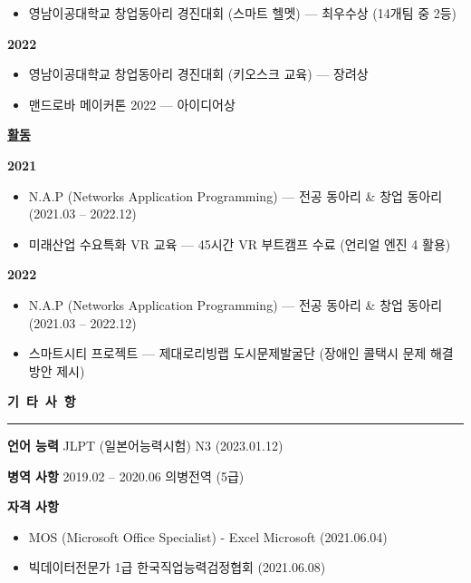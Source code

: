 \documentclass[a4paper, 10pt]{article}
\newcommand{\resumesection}[1]{%
  \vspace{8pt}
  \noindent
  {\large\bfseries #1}
  \vspace{2pt}
  \noindent\hrule
  \vspace{4pt}
}
\begin{document}
\begin{itemize}
  \setlength{\itemsep}{1pt}
  \setlength{\parskip}{0pt}
  \item 영남이공대학교 창업동아리 경진대회 (스마트 헬멧) — 최우수상 (14개팀 중 2등)
\end{itemize}

\vspace{2pt}
\noindent
\textbf{2022}

\begin{itemize}
  \setlength{\itemsep}{1pt}
  \setlength{\parskip}{0pt}
  \item 영남이공대학교 창업동아리 경진대회 (키오스크 교육) — 장려상
  \item 맨드로바 메이커톤 2022 — 아이디어상
\end{itemize}

\vspace{4pt}
\noindent
\textbf{\underline{활동}}

\vspace{2pt}
\noindent
\textbf{2021}

\begin{itemize}
  \setlength{\itemsep}{1pt}
  \setlength{\parskip}{0pt}
  \item N.A.P (Networks Application Programming) — 전공 동아리 & 창업 동아리 (2021.03 -- 2022.12)
  \item 미래산업 수요특화 VR 교육 — 45시간 VR 부트캠프 수료 (언리얼 엔진 4 활용)
\end{itemize}

\vspace{2pt}
\noindent
\textbf{2022}

\begin{itemize}
  \setlength{\itemsep}{1pt}
  \setlength{\parskip}{0pt}
  \item N.A.P (Networks Application Programming) — 전공 동아리 & 창업 동아리 (2021.03 -- 2022.12)
  \item 스마트시티 프로젝트 — 제대로리빙랩 도시문제발굴단 (장애인 콜택시 문제 해결방안 제시)
\end{itemize}


\newpage

\resumesection{기\ 타\ 사\ 항}

\vspace{3pt}
\noindent
\textbf{언어 능력} \hfill JLPT (일본어능력시험) N3 (2023.01.12)

\vspace{2pt}
\noindent
\textbf{병역 사항} \hfill 2019.02 -- 2020.06 의병전역 (5급)

\vspace{2pt}
\noindent
\textbf{자격 사항}

\begin{itemize}
  \setlength{\itemsep}{1pt}
  \setlength{\parskip}{0pt}
  \item MOS (Microsoft Office Specialist) - Excel \hfill Microsoft (2021.06.04)
  \item 빅데이터전문가 1급 \hfill 한국직업능력검정협회 (2021.06.08)
\end{itemize}
\end{document}
